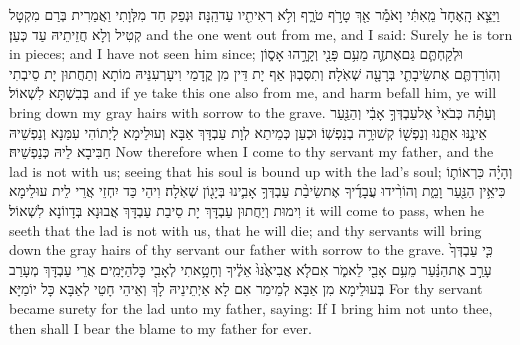 {וַיֵּצֵ֤א הָֽאֶחָד֙ מֵֽאִתִּ֔י וָאֹמַ֕ר אַ֖ךְ טָרֹ֣ף טֹרָ֑ף וְלֹ֥א רְאִיתִ֖יו עַד\maqqaf הֵֽנָּה׃}
{וּנְפַק חַד מִלְּוָתִי וַאֲמַרִית בְּרַם מִקְטָל קְטִיל וְלָא חֲזֵיתֵיהּ עַד כְּעַן׃}
{and the one went out from me, and I said: Surely he is torn in pieces; and I have not seen him since;}{}
{וּלְקַחְתֶּ֧ם גַּם\maqqaf אֶת\maqqaf זֶ֛ה מֵעִ֥ם פָּנַ֖י וְקָרָ֣הוּ אָס֑וֹן וְהֽוֹרַדְתֶּ֧ם אֶת\maqqaf שֵׂיבָתִ֛י בְּרָעָ֖ה שְׁאֹֽלָה׃}
{וְתִסְּבְוּן אַף יָת דֵּין מִן קֳדָמַי וִיעָרְעִנֵּיהּ מוֹתָא וְתַחֲתוּן יָת סֵיבְתִי בְּבִשְׁתָּא לִשְׁאוֹל׃}
{and if ye take this one also from me, and harm befall him, ye will bring down my gray hairs with sorrow to the grave.}{}
{וְעַתָּ֗ה כְּבֹאִי֙ אֶל\maqqaf עַבְדְּךָ֣ אָבִ֔י וְהַנַּ֖עַר אֵינֶ֣נּוּ אִתָּ֑נוּ וְנַפְשׁ֖וֹ קְשׁוּרָ֥ה בְנַפְשֽׁוֹ׃}
{וּכְעַן כְּמֵיתַא לְוָת עַבְדָּךְ אַבָּא וְעוּלֵימָא לָיְתוֹהִי עִמַּנָא וְנַפְשֵׁיהּ חַבִּיבָא לֵיהּ כְּנַפְשֵׁיהּ׃}
{Now therefore when I come to thy servant my father, and the lad is not with us; seeing that his soul is bound up with the lad’s soul;}{}
{וְהָיָ֗ה כִּרְאוֹת֛וֹ כִּי\maqqaf אֵ֥ין הַנַּ֖עַר וָמֵ֑ת וְהוֹרִ֨ידוּ עֲבָדֶ֜יךָ אֶת\maqqaf שֵׂיבַ֨ת עַבְדְּךָ֥ אָבִ֛ינוּ בְּיָג֖וֹן שְׁאֹֽלָה׃}
{וִיהֵי כַּד יִחְזֵי אֲרֵי לֵית עוּלֵימָא וִימוּת וְיַחֲתוּן עַבְדָּךְ יָת סֵיבַת עַבְדָּךְ אֲבוּנָא בְּדָווֹנָא לִשְׁאוֹל׃}
{it will come to pass, when he seeth that the lad is not with us, that he will die; and thy servants will bring down the gray hairs of thy servant our father with sorrow to the grave.}{}
{כִּ֤י עַבְדְּךָ֙ עָרַ֣ב אֶת\maqqaf הַנַּ֔עַר מֵעִ֥ם אָבִ֖י לֵאמֹ֑ר אִם\maqqaf לֹ֤א אֲבִיאֶ֙נּוּ֙ אֵלֶ֔יךָ וְחָטָ֥אתִי לְאָבִ֖י כׇּל\maqqaf הַיָּמִֽים׃}
{אֲרֵי עַבְדָּךְ מְעָרַב בְּעוּלֵימָא מִן אַבָּא לְמֵימַר אִם לָא אַיְתֵינֵיהּ לָךְ וְאֵיהֵי חָטֵי לְאַבָּא כָּל יוֹמַיָּא׃}
{For thy servant became surety for the lad unto my father, saying: If I bring him not unto thee, then shall I bear the blame to my father for ever.}{}

